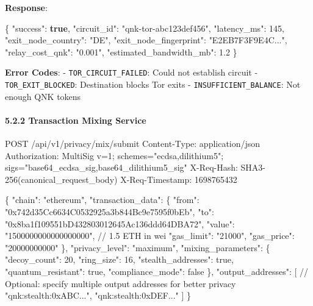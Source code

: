\documentclass[
  11pt,
]{article}
\newenvironment{Shaded}{\begin{snugshade}}{\end{snugshade}}
\newcommand{\DataTypeTok}[1]{\textcolor[rgb]{0.13,0.29,0.53}{#1}}
\newcommand{\DecValTok}[1]{\textcolor[rgb]{0.00,0.00,0.81}{#1}}
\newcommand{\FloatTok}[1]{\textcolor[rgb]{0.00,0.00,0.81}{#1}}
\newcommand{\FunctionTok}[1]{\textcolor[rgb]{0.00,0.00,0.00}{#1}}
\newcommand{\KeywordTok}[1]{\textcolor[rgb]{0.13,0.29,0.53}{\textbf{#1}}}
\newcommand{\NormalTok}[1]{#1}
\newcommand{\StringTok}[1]{\textcolor[rgb]{0.31,0.60,0.02}{#1}}
\begin{document}
\textbf{Response}:

\begin{Shaded}
\begin{Highlighting}[]
\FunctionTok{\{}
  \DataTypeTok{"success"}\FunctionTok{:} \KeywordTok{true}\FunctionTok{,}
  \DataTypeTok{"circuit\_id"}\FunctionTok{:} \StringTok{"qnk{-}tor{-}abc123def456"}\FunctionTok{,}
  \DataTypeTok{"latency\_ms"}\FunctionTok{:} \DecValTok{145}\FunctionTok{,}
  \DataTypeTok{"exit\_node\_country"}\FunctionTok{:} \StringTok{"DE"}\FunctionTok{,}
  \DataTypeTok{"exit\_node\_fingerprint"}\FunctionTok{:} \StringTok{"E2EB7F3F9E4C..."}\FunctionTok{,}
  \DataTypeTok{"relay\_cost\_qnk"}\FunctionTok{:} \StringTok{"0.001"}\FunctionTok{,}
  \DataTypeTok{"estimated\_bandwidth\_mb"}\FunctionTok{:} \FloatTok{1.2}
\FunctionTok{\}}
\end{Highlighting}
\end{Shaded}

\textbf{Error Codes}: - \texttt{TOR\_CIRCUIT\_FAILED}: Could not
establish circuit - \texttt{TOR\_EXIT\_BLOCKED}: Destination blocks Tor
exits - \texttt{INSUFFICIENT\_BALANCE}: Not enough QNK tokens

\hypertarget{transaction-mixing-service}{%
\paragraph{5.2.2 Transaction Mixing
Service}\label{transaction-mixing-service}}

\begin{Shaded}
\begin{Highlighting}[]
\NormalTok{POST /api/v1/privacy/mix/submit}
\NormalTok{Content{-}Type: application/json}
\NormalTok{Authorization: MultiSig v=1; schemes="ecdsa,dilithium5"; sigs="base64\_ecdsa\_sig,base64\_dilithium5\_sig"}
\NormalTok{X{-}Req{-}Hash: SHA3{-}256(canonical\_request\_body)}
\NormalTok{X{-}Req{-}Timestamp: 1698765432}

\NormalTok{\{}
\NormalTok{  "chain": "ethereum",}
\NormalTok{  "transaction\_data": \{}
\NormalTok{    "from": "0x742d35Cc6634C0532925a3b844Bc9e7595f0bEb",}
\NormalTok{    "to": "0x8ba1f109551bD432803012645Ac136ddd64DBA72",}
\NormalTok{    "value": "1500000000000000000",  // 1.5 ETH in wei}
\NormalTok{    "gas\_limit": "21000",}
\NormalTok{    "gas\_price": "20000000000"}
\NormalTok{  \},}
\NormalTok{  "privacy\_level": "maximum",}
\NormalTok{  "mixing\_parameters": \{}
\NormalTok{    "decoy\_count": 20,}
\NormalTok{    "ring\_size": 16,}
\NormalTok{    "stealth\_addresses": true,}
\NormalTok{    "quantum\_resistant": true,}
\NormalTok{    "compliance\_mode": false}
\NormalTok{  \},}
\NormalTok{  "output\_addresses": [}
\NormalTok{    // Optional: specify multiple output addresses for better privacy}
\NormalTok{    "qnk:stealth:0xABC...",}
\NormalTok{    "qnk:stealth:0xDEF..."}
\NormalTok{  ]}
\NormalTok{\}}
\end{Highlighting}
\end{Shaded}
\end{document}
